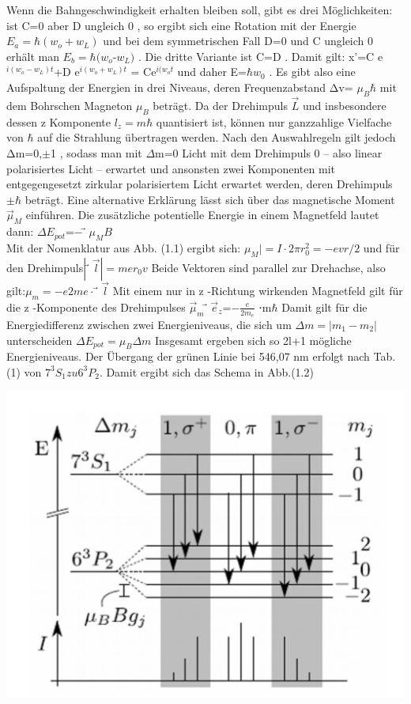 \documentclass[10pt,a4paper]{article}
\begin{document}
Wenn die Bahngeschwindigkeit erhalten bleiben soll,  gibt es drei Möglichkeiten: ist C=0 aber D ungleich 0 , so ergibt sich eine Rotation mit der Energie $E_{a}=\hbar (w_{o}+w_{L})$ und bei dem symmetrischen Fall D=0 und C ungleich 0 erhält man $E_{b}=\hbar(w_{o}$-$w_{L})$ . Die dritte Variante ist C=D . Damit gilt:  x'=C e$^{i(w_{o}-w_{L})t}$+D e$^{i(w_{o}+w_{L})t}$ = Ce$^{i(w_{o}t}$ und daher E=$\hbar w_{0}$ . Es gibt also eine Aufspaltung der Energien in drei Niveaus, deren Frequenzabstand Δv=
$\mu_{B} \hbar$ mit dem 
Bohrschen Magneton $\mu_B$  beträgt. Da der Drehimpuls ⃗$\overrightarrow{L}$ und insbesondere dessen z Komponente $l_z=m\hbar$  quantisiert ist, können nur ganzzahlige Vielfache von $\hbar$  auf die Strahlung übertragen werden. Nach den Auswahlregeln gilt jedoch Δm=0,$\pm$1 , sodass man mit $\Delta$m=0 Licht mit dem Drehimpuls 0 – also linear polarisiertes Licht – erwartet und ansonsten zwei Komponenten mit entgegengesetzt zirkular polarisiertem Licht erwartet werden, deren Drehimpuls $\pm\hbar$  beträgt. Eine alternative Erklärung lässt sich über das magnetische Moment ⃗$\overrightarrow{\mu}_M$  einführen. Die zusätzliche potentielle Energie in einem Magnetfeld lautet dann: $\Delta E_{pot}$=−$ ⃗\mu_M B$\\


Mit der Nomenklatur aus Abb. (1.1) ergibt sich: $\mu_M|=I⋅2\pi r_0^2=−evr/2$ und für den Drehimpuls$ |⃗\overrightarrow{l}|=mer_0v$ Beide Vektoren sind parallel zur Drehachse, also gilt:$\mu_m=− e 2me ⋅⃗\overrightarrow{l}$ Mit einem nur in z -Richtung wirkenden Magnetfeld gilt für die z -Komponente des Drehimpulses ⃗$\overrightarrow{\mu}_m⃗\overrightarrow{e}_z$=−$\frac{e}{2m_e}$ ⋅m$\hbar$ Damit gilt für die Energiedifferenz zwischen zwei Energieniveaus, die sich um $\Delta m=|m_1-m_2|$ unterscheiden  $\Delta E_{pot}=\mu_B\Delta m$ Insgesamt ergeben sich so 2l+1 mögliche Energieniveaus. Der Übergang der grünen Linie bei 546,07 nm erfolgt nach Tab.(1) von $7^3S_1  zu 6^3P_2$. Damit ergibt sich das Schema in Abb.(1.2)

\includegraphics{73s1}
\end{document}
